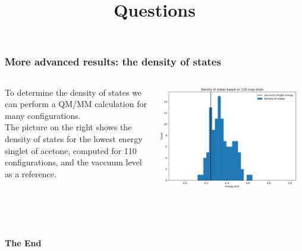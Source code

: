\documentclass[t,aspectratio=169, 8pt]{beamer}
\begin{document}
\begin{chapterframe}
  \frametitle{More advanced results: the density of states}
  \begin{columns}[c]
    \begin{column}{0.48\textwidth}
      To determine the density of states we can perform a QM/MM calculation for
      many configurations. \\ \vspace{0.3cm} The picture on the right shows the
      density of states for the lowest energy singlet of acetone, computed for
      110 configurations, and the vaccuum level as a reference.
    \end{column}
    \begin{column}{0.48\textwidth}
      \includegraphics[width=0.95\textwidth]{images/dos/DOS_shifted.pdf}
    \end{column}
  \end{columns}
\end{chapterframe}

\title{Questions}
\begin{chapterframe}
	\frametitle{ ~}
	\vspace{1.5cm}
	\begin{center}
		{\fontsize{28}{48} \selectfont \bfseries{The End}}
	\end{center}
\end{chapterframe}
\end{document}
